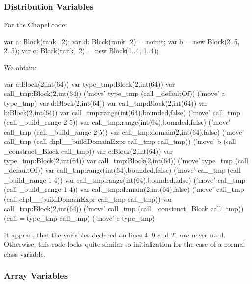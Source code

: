 \subsubsection{Distribution Variables}

For the Chapel code:
\begin{chapel}
var a: Block(rank=2);
var d: Block(rank=2) = noinit;
var b = new Block({2..5, 2..5});
var c: Block(rank=2) = new Block({1..4, 1..4});
\end{chapel}
We obtain:
\begin{numberedchapel}
    var a:Block(2,int(64))
    {
      var type_tmp:Block(2,int(64))
      var call_tmp:Block(2,int(64))
      ('move' type_tmp (call _defaultOf))
      ('move' a type_tmp)
    }
    var d:Block(2,int(64))
    var call_tmp:Block(2,int(64))
    var b:Block(2,int(64))
    var call_tmp:range(int(64),bounded,false)
    ('move' call_tmp (call _build_range 2 5))
    var call_tmp:range(int(64),bounded,false)
    ('move' call_tmp (call _build_range 2 5))
    var call_tmp:domain(2,int(64),false)
    ('move' call_tmp (call chpl__buildDomainExpr call_tmp call_tmp))
    ('move' b (call _construct_Block call_tmp))
    var c:Block(2,int(64))
    {
      var type_tmp:Block(2,int(64))
      var call_tmp:Block(2,int(64))
      ('move' type_tmp (call _defaultOf))
      var call_tmp:range(int(64),bounded,false)
      ('move' call_tmp (call _build_range 1 4))
      var call_tmp:range(int(64),bounded,false)
      ('move' call_tmp (call _build_range 1 4))
      var call_tmp:domain(2,int(64),false)
      ('move' call_tmp (call chpl__buildDomainExpr call_tmp call_tmp))
      var call_tmp:Block(2,int(64))
      ('move' call_tmp (call _construct_Block call_tmp))
      (call = type_tmp call_tmp)
      ('move' c type_tmp)
    }
\end{numberedchapel}
It appears that the  variables declared on lines 4, 9 and 21 are never
used.  Otherwise, this code looks quite similar to initialization for the case of a normal
class variable.

\subsubsection{Array Variables}

